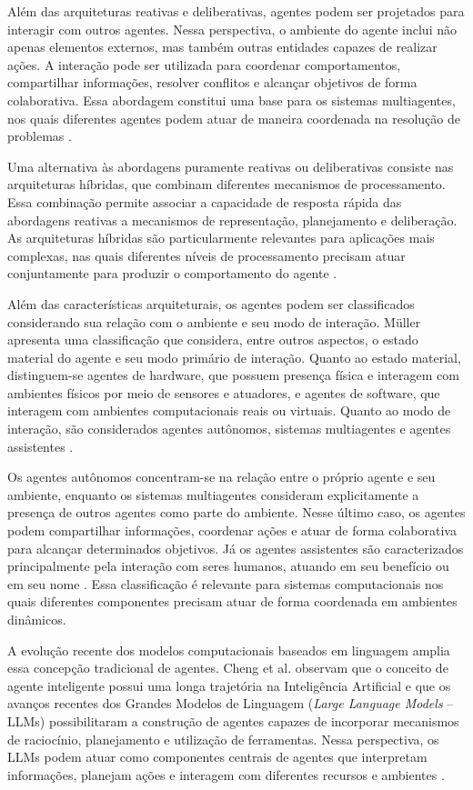 Além das arquiteturas reativas e deliberativas, agentes podem ser projetados
para interagir com outros agentes. Nessa perspectiva, o ambiente do agente
inclui não apenas elementos externos, mas também outras entidades capazes de
realizar ações. A interação pode ser utilizada para coordenar comportamentos,
compartilhar informações, resolver conflitos e alcançar objetivos de forma
colaborativa. Essa abordagem constitui uma base para os sistemas
multiagentes, nos quais diferentes agentes podem atuar de maneira coordenada
na resolução de problemas \cite{muller1999}.

Uma alternativa às abordagens puramente reativas ou deliberativas consiste
nas arquiteturas híbridas, que combinam diferentes mecanismos de
processamento. Essa combinação permite associar a capacidade de resposta
rápida das abordagens reativas a mecanismos de representação, planejamento e
deliberação. As arquiteturas híbridas são particularmente relevantes para
aplicações mais complexas, nas quais diferentes níveis de processamento
precisam atuar conjuntamente para produzir o comportamento do agente
\cite{muller1999}.

Além das características arquiteturais, os agentes podem ser classificados
considerando sua relação com o ambiente e seu modo de interação. Müller
\cite{muller1999} apresenta uma classificação que considera, entre outros
aspectos, o estado material do agente e seu modo primário de interação.
Quanto ao estado material, distinguem-se agentes de hardware, que possuem
presença física e interagem com ambientes físicos por meio de sensores e
atuadores, e agentes de software, que interagem com ambientes computacionais
reais ou virtuais. Quanto ao modo de interação, são considerados agentes
autônomos, sistemas multiagentes e agentes assistentes
\cite{muller1999}.

Os agentes autônomos concentram-se na relação entre o próprio agente e seu
ambiente, enquanto os sistemas multiagentes consideram explicitamente a
presença de outros agentes como parte do ambiente. Nesse último caso, os
agentes podem compartilhar informações, coordenar ações e atuar de forma
colaborativa para alcançar determinados objetivos. Já os agentes assistentes
são caracterizados principalmente pela interação com seres humanos, atuando
em seu benefício ou em seu nome \cite{muller1999}. Essa classificação é
relevante para sistemas computacionais nos quais diferentes componentes
precisam atuar de forma coordenada em ambientes dinâmicos.

A evolução recente dos modelos computacionais baseados em linguagem amplia
essa concepção tradicional de agentes. Cheng et al. \cite{cheng2026}
observam que o conceito de agente inteligente possui uma longa trajetória na
Inteligência Artificial e que os avanços recentes dos Grandes Modelos de
Linguagem (\textit{Large Language Models} -- LLMs) possibilitaram a
construção de agentes capazes de incorporar mecanismos de raciocínio,
planejamento e utilização de ferramentas. Nessa perspectiva, os LLMs podem
atuar como componentes centrais de agentes que interpretam informações,
planejam ações e interagem com diferentes recursos e ambientes
\cite{cheng2026}.

